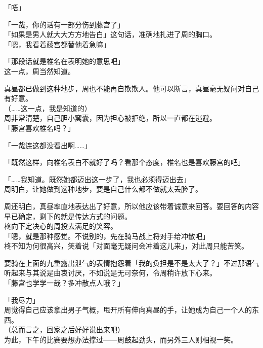 「唔」

「一哉，你的话有一部分伤到藤宫了」\\

「如果是男人就大大方方地告白」这句话，准确地扎进了周的胸口。\\

「嗯，我看着藤宫都替他着急嘛」

「那段话就是椎名在表明她的意思吧」\\

这一点，周当然知道。

真昼都已做到这种地步，周也不能再自欺欺人。他可以断言，真昼毫无疑问对自己有好意。\\

（……这一点，我是知道的）\\

周非常清楚，自己胆小窝囊，因为担心被拒绝，所以一直都在逃避。\\

「藤宫喜欢椎名吗？」

「一哉连这都没看出啊……」

「既然这样，向椎名表白不就好了吗？看那个态度，椎名也是喜欢藤宫的吧」

「……我知道。既然她都迈出这一步了，我也必须得迈出去」\\

周明白，让她做到这种地步，要是自己什么都不做就太丢脸了。

周还明白，真昼率直地表达出了好意，所以他应该带着诚意来回答。要回答的内容早已确定，剩下的就是传达方式的问题。\\

柊向下定决心的周投去满足的笑容。\\

「嗯，就是那种感觉。不说别的，先在骑马战上将对手给冲散吧」\\

柊不知为何很高兴，笑着说「对面毫无疑问会冲着这儿来」，对此周只能苦笑。

要骑在上面的九重露出泄气的表情抱怨着「我的负担是不是太大了？」不过那语气听起来与其说是由衷讨厌，不如说是无可奈何，令周稍许放下心来。\\

「藤宫也学学一哉？多冲散点人哦？」

「我尽力」\\

周觉得自己应该拿出男子气概，甩开所有伸向真昼的手，让她成为自己一个人的东西。\\

（总而言之，回家之后好好说出来吧）\\

为此，下午的比赛要想办法撑过——周鼓起劲头，而另外三人则相视一笑。
